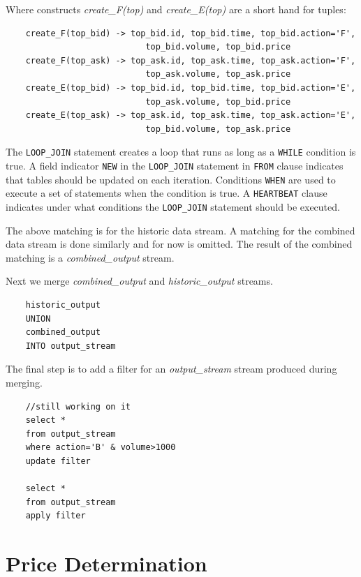 \documentclass{article}
\begin{document}
\noindent Where constructs \emph{create\_F(top)} and \emph{create\_E(top)} are a short hand for tuples:

\begin{verbatim}
    create_F(top_bid) -> top_bid.id, top_bid.time, top_bid.action='F',
                            top_bid.volume, top_bid.price
    create_F(top_ask) -> top_ask.id, top_ask.time, top_ask.action='F',
                            top_ask.volume, top_ask.price
    create_E(top_bid) -> top_bid.id, top_bid.time, top_bid.action='E',
                            top_ask.volume, top_bid.price
    create_E(top_ask) -> top_ask.id, top_ask.time, top_ask.action='E',
                            top_bid.volume, top_ask.price
\end{verbatim}

The {\tt LOOP\_JOIN} statement creates a loop that runs as long as a {\tt WHILE} condition is true. A field indicator {\tt NEW} in the {\tt LOOP\_JOIN} statement in {\tt FROM} clause indicates that tables should be updated on each iteration. Conditions {\tt WHEN} are used to execute a set of statements when the condition is true. A {\tt HEARTBEAT} clause indicates under what conditions the {\tt LOOP\_JOIN} statement should be executed. 

The above matching is for the historic data stream. A matching for the combined data stream is done similarly and for now is omitted. The result of the combined matching is a \emph{combined\_output} stream. 

Next we merge \emph{combined\_output} and \emph{historic\_output} streams. 

\begin{verbatim}
    historic_output
    UNION
    combined_output
    INTO output_stream
\end{verbatim}

The final step is to add a filter for an \emph{output\_stream} stream produced during merging. 

\begin{verbatim}
    //still working on it
    select *
    from output_stream
    where action='B' & volume>1000
    update filter
    
    select *
    from output_stream
    apply filter
\end{verbatim}

\section{Price Determination}
\end{document}
